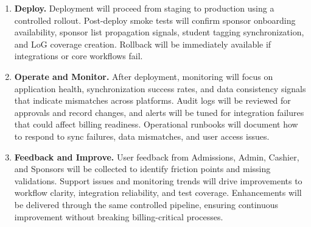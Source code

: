 \begin{enumerate}
            \item \textbf{Deploy.} Deployment will proceed from staging to production using a controlled rollout. Post-deploy smoke tests will confirm sponsor onboarding availability, sponsor list propagation signals, student tagging synchronization, and LoG coverage creation. Rollback will be immediately available if integrations or core workflows fail.
            \item \textbf{Operate and Monitor.} After deployment, monitoring will focus on application health, synchronization success rates, and data consistency signals that indicate mismatches across platforms. Audit logs will be reviewed for approvals and record changes, and alerts will be tuned for integration failures that could affect billing readiness. Operational runbooks will document how to respond to sync failures, data mismatches, and user access issues.
            \item \textbf{Feedback and Improve.} User feedback from Admissions, Admin, Cashier, and Sponsors will be collected to identify friction points and missing validations. Support issues and monitoring trends will drive improvements to workflow clarity, integration reliability, and test coverage. Enhancements will be delivered through the same controlled pipeline, ensuring continuous improvement without breaking billing-critical processes.
        \end{enumerate}

